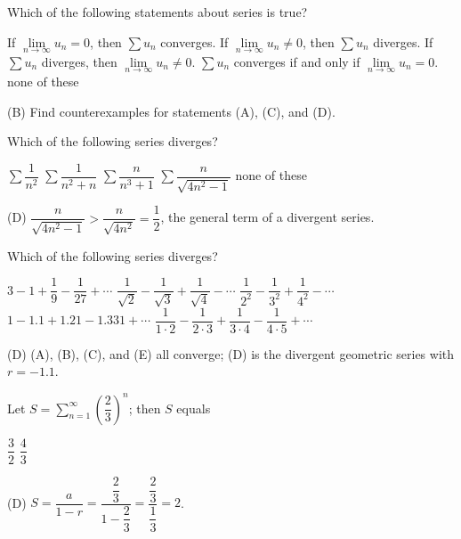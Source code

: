 \question
Which of the following statements about series is true?
\begin{choices}
  \choice If $\lim\limits_{n \to \infty} u_{n}=0$, then $\sum u_{n}$ converges.
  \CorrectChoice If $\lim\limits_{n \to \infty} u_{n} \neq 0$, then $\sum u_{n}$ diverges.
  \choice If $\sum u_{n}$ diverges, then $\lim\limits_{n \to \infty} u_{n} \neq 0$.
  \choice $\sum u_{n}$ converges if and only if $\lim\limits_{n \to \infty} u_{n}=0$.
  \choice none of these
\end{choices}
\begin{solution}
(B) Find counterexamples for statements (A), (C), and (D).
\end{solution}


\newpage




\question
Which of the following series diverges?
\begin{choices}
  \choice $\sum \dfrac{1}{n^{2}}$
  \choice $\sum \dfrac{1}{n^{2}+n}$
  \choice $\sum \dfrac{n}{n^{3}+1}$
  \CorrectChoice $\sum \dfrac{n}{\sqrt{4 n^{2}-1}}$
  \choice none of these
\end{choices}
\begin{solution}
(D) $\dfrac{n}{\sqrt{4 n^{2}-1}}>\dfrac{n}{\sqrt{4 n^{2}}}=\dfrac{1}{2}$, the general term of a divergent series.
\end{solution}

\question
Which of the following series diverges?
\begin{choices}
  \choice $3-1+\dfrac{1}{9}-\dfrac{1}{27}+\cdots$
  \choice $\dfrac{1}{\sqrt{2}}-\dfrac{1}{\sqrt{3}}+\dfrac{1}{\sqrt{4}}-\cdots$
  \choice $\dfrac{1}{2^{2}}-\dfrac{1}{3^{2}}+\dfrac{1}{4^{2}}-\cdots$
  \CorrectChoice $1-1.1+1.21-1.331+\cdots$
  \choice $\dfrac{1}{1 \cdot 2}-\dfrac{1}{2 \cdot 3}+\dfrac{1}{3 \cdot 4}-\dfrac{1}{4 \cdot 5}+\cdots$
\end{choices}
\begin{solution}
(D) (A), (B), (C), and (E) all converge; (D) is the divergent geometric series with $r=-1.1$.
\end{solution}

\question
Let $S=\sum\limits_{n=1}^{\infty}\left(\dfrac{2}{3}\right)^{n}$; then $S$ equals
\begin{choices}
  \choice $\dfrac{3}{2}$
  \choice $\dfrac{4}{3}$
\end{choices}
\begin{solution}
(D) $S=\dfrac{a}{1-r}=\dfrac{\dfrac{2}{3}}{1-\dfrac{2}{3}}=\dfrac{\dfrac{2}{3}}{\dfrac{1}{3}}=2$.
\end{solution}



